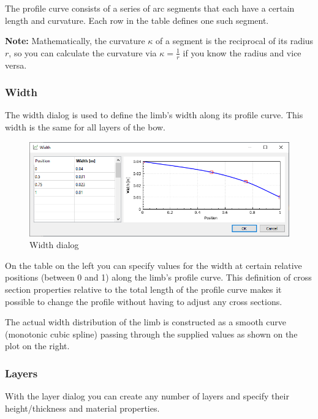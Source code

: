 \documentclass[12pt]{article}
\begin{document}
The profile curve consists of a series of arc segments that each have a certain length and curvature. Each row in the table defines one such segment.

\textbf{Note:} Mathematically, the curvature $\kappa$ of a segment is the reciprocal of its radius $r$, so you can calculate the curvature via $\kappa = \frac{1}{r}$ if you know the radius and vice versa.

\newpage
\subsubsection{Width}

The width dialog is used to define the limb's width along its profile curve. This width is the same for all layers of the bow.

\begin{figure}[H]
\centering
\includegraphics[width=\textwidth]{figures/screenshots/input/width}
\caption{Width dialog}
\label{fig:width}
\end{figure}

On the table on the left you can specify values for the width at certain relative positions (between 0 and 1) along the limb's profile curve. This definition of cross section properties relative to the total length of the profile curve makes it possible to change the profile without having to adjust any cross sections.

The actual width distribution of the limb is constructed as a smooth curve (monotonic cubic spline) passing through the supplied values as shown on the plot on the right.

\newpage
\subsubsection{Layers}

With the layer dialog you can create any number of layers and specify their height/thickness and material properties.
\end{document}
